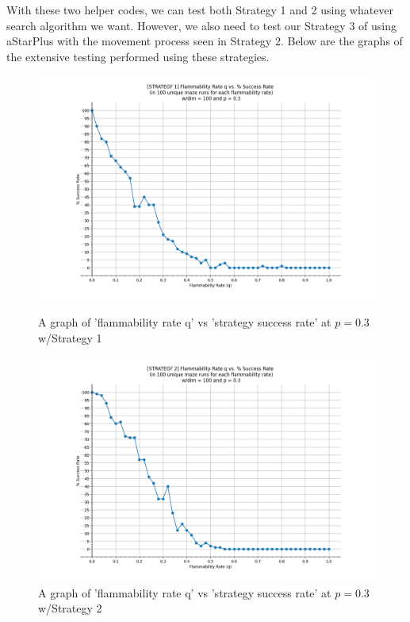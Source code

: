 \documentclass[11pt]{article}
\begin{document}
With these two helper codes, we can test both Strategy 1 and 2 using whatever search algorithm we want. However, we also need to test our Strategy 3 of using aStarPlus with the movement process seen in Strategy 2. Below are the graphs of the extensive testing performed using these strategies.
\begin{figure}[!]
\centering
\includegraphics[scale=0.50]{Strategy1_q_successRate.PNG}
\caption{A graph of 'flammability rate q' vs 'strategy success rate' at $p = 0.3$ w/Strategy 1}
\includegraphics[scale=0.50]{Strategy2_q_successRate.PNG}
\caption{A graph of 'flammability rate q' vs 'strategy success rate' at $p = 0.3$ w/Strategy 2}
\end{figure}
\end{document}
